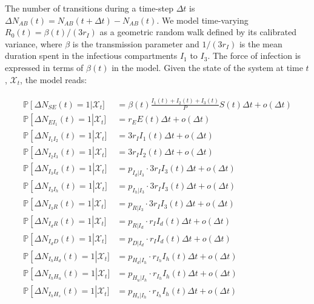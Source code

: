 The number of transitions during a time-step $\Delta t$ is
\(\Delta N_{AB}(t) = N_{AB}(t+\Delta t) - N_{AB}(t)\). We model time-varying $R_0(t) = \beta(t)/(3r_I)$ as a geometric random walk defined by its calibrated variance, where $\beta$ is the transmission parameter and $1/(3r_I)$ is the mean duration spent in the infectious compartments $I_1$ to $I_3$. The force of infection is expressed in terms of $\beta(t)$ in the model. Given the state of the system at time \(t\), \(\mathcal{X}_t\), the model reads:

\begin{gather}
\label{eq:stochsys}
\begin{aligned}
    \mathbb{P}\left[ \Delta N_{SE}(t) = 1 \right|\mathcal{X}_t] &=  \beta(t)  \frac{I_1(t) + I_2(t) + I_3(t)}{P} S(t) \Delta t + o(\Delta t)\\
    \mathbb{P}\left[ \Delta N_{EI_1}(t) = 1 \right|\mathcal{X}_t] &= r_{E} E(t) \Delta t + o(\Delta t) \\
    \mathbb{P}\left[ \Delta N_{I_1 I_2}(t) = 1 \right|\mathcal{X}_t] &= 3r_{I} I_1(t) \Delta t + o(\Delta t)\\
    \mathbb{P}\left[ \Delta N_{I_2 I_3}(t) = 1 \right|\mathcal{X}_t] &= 3r_{I} I_2(t) \Delta t + o(\Delta t)\\
    \mathbb{P}\left[ \Delta N_{I_3 I_d}(t) = 1 \right|\mathcal{X}_t] &= p_{I_d|I_3} \cdot 3r_{I}  I_3(t) \Delta t + o(\Delta t)\\
    \mathbb{P}\left[ \Delta N_{I_3 I_h}(t) = 1 \right|\mathcal{X}_t] &= p_{I_h|I_3} \cdot 3r_{I}   I_3(t) \Delta t + o(\Delta t)\\
    \mathbb{P}\left[ \Delta N_{I_3 R}(t) = 1 \right|\mathcal{X}_t] &= p_{R|I_3} \cdot 3r_{I}  I_3(t) \Delta t + o(\Delta t)\\
    \mathbb{P}\left[ \Delta N_{I_d R}(t) = 1 \right|\mathcal{X}_t] &= p_{R|I_d} \cdot r_{I}  I_d(t) \Delta t + o(\Delta t)\\
    \mathbb{P}\left[ \Delta N_{I_d D}(t) = 1 \right|\mathcal{X}_t] &= p_{D|I_d}\cdot r_{I} I_d(t) \Delta t + o(\Delta t)\\
    \mathbb{P}\left[ \Delta N_{I_h H_d}(t) = 1 \right|\mathcal{X}_t] &= p_{H_d|I_h} \cdot r_{I_h}  I_h(t) \Delta t + o(\Delta t)\\
    \mathbb{P}\left[ \Delta N_{I_h H_u}(t) = 1 \right|\mathcal{X}_t] &= p_{H_u|I_h} \cdot r_{I_h} I_h(t) \Delta t + o(\Delta t)\\
    \mathbb{P}\left[ \Delta N_{I_h H_s}(t) = 1 \right|\mathcal{X}_t] &= p_{H_s|I_h} \cdot r_{I_h} I_h(t) \Delta t + o(\Delta t)\\

\end{aligned}
\end{gather}
